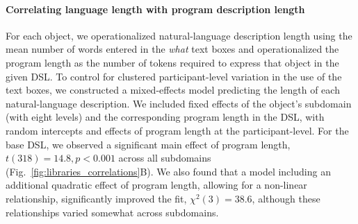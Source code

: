 \documentclass[10pt,letterpaper]{article}
\begin{document}


%
%
%
% 

\paragraph{Correlating language length with program description length}
For each object, we operationalized natural-language description length using the mean number of words entered in the \textit{what} text boxes and operationalized the program length as the number of tokens required to express that object in the given DSL.
To control for clustered participant-level variation in the use of the text boxes, we constructed a mixed-effects model predicting the length of each natural-language description. 
We included fixed effects of the object's subdomain (with eight levels) and the corresponding program length in the DSL, with random intercepts and effects of program length at the participant-level. 
For the base DSL, we observed a significant main effect of program length, $t(318)=14.8, p < 0.001$ across all subdomains (Fig.~\ref{fig:libraries_correlations}B).
We also found that a model including an additional quadratic effect of program length, allowing for a non-linear relationship, significantly improved the fit, $\chi^2(3)=38.6$, although these relationships varied somewhat across subdomains.
\end{document}

